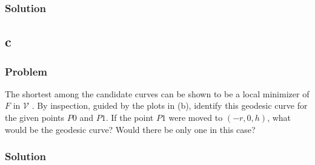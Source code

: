 \documentclass[12pt,twoside]{article}
\begin{document}
\subsubsection*{Solution}
\todo{}

\subsection{c}
\subsubsection*{Problem}
The shortest among the candidate curves can be shown to be a local minimizer of
$F$ in $\mathcal{V}$ . By inspection, guided by the plots in (b), identify this
geodesic curve for the given points $P0$ and $P1$. If the point $P1$ were moved
to $(−r,0,h)$, what would be the geodesic curve? Would there be only one in this
case?

\subsubsection*{Solution}
\todo{}
\end{document}
